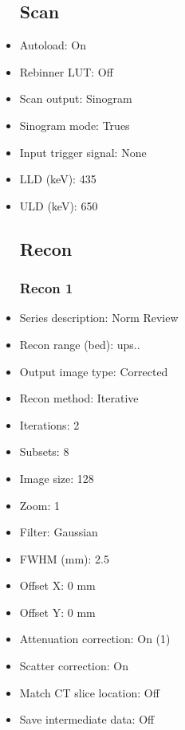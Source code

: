 \documentclass[12pt]{article}
\begin{document}
\begin{itemize}
\subsection{Scan}
\item Autoload: On
\item Rebinner LUT: Off
\item Scan output: Sinogram
\item Sinogram mode: Trues
\item Input trigger signal: None
\item LLD (keV): 435
\item ULD (keV): 650
\subsection{Recon}

\subsubsection{Recon 1}
\item Series description: Norm Review
\item Recon range (bed): ups..
\item Output image type: Corrected
\item Recon method: Iterative
\item Iterations: 2
\item Subsets: 8
\item Image size: 128
\item Zoom: 1
\item Filter: Gaussian
\item FWHM (mm): 2.5
\item Offset X: 0 mm
\item Offset Y: 0 mm
\item Attenuation correction: On (1)
\item Scatter correction: On
\item Match CT slice location: Off
\item Save intermediate data: Off
\end{itemize}
\end{document}
